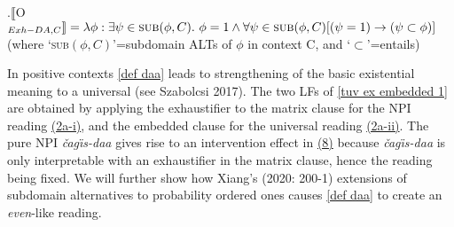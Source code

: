\documentclass[11pt]{article}
\newcommand{\changis}{\v{c}a\textipa{N}g\"{\i}s}
\begin{document}
\vspace{-8pt}
\ex.\label{def daa}$\llbracket$O$_{Exh-DA,C}\rrbracket=\lambda \phi:\exists \psi \in \textsc{sub}(\phi,C).\ \phi =1\wedge \forall \psi \in \textsc{sub}(\phi,C)[(\psi=1)\rightarrow (\psi \subset \phi)]$\\(where `\textsc{sub}$(\phi,C)$'=subdomain ALTs of $\phi$ in context C, and `$\subset$'=entails)
\vspace{-8pt}

In positive contexts \ref{def daa} leads to strengthening of the basic existential meaning to a universal (see Szabolcsi 2017).  The two LFs of \ref{tuv ex embedded 1} are obtained by applying the exhaustifier to the matrix clause for the NPI reading \hyperref[tuv ex embedded 1]{(2a-i)}, and the embedded clause for the universal reading \hyperref[tuv ex embedded 1]{(2a-ii)}.  The pure NPI \textit{\changis-daa} gives rise to an intervention effect in \hyperref[double embedded]{(8)} because \textit{\changis-daa} is only interpretable with an exhaustifier in the matrix clause, hence the reading being fixed.  We will further show how Xiang's (2020: 200-1) extensions of subdomain alternatives to probability ordered ones causes \ref{def daa} to create an \textit{even}-like reading.







\end{document}
